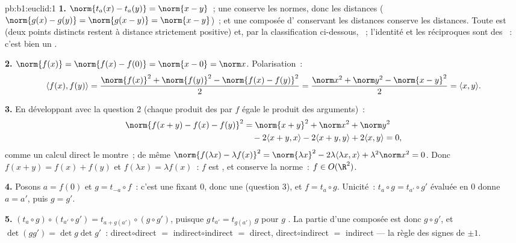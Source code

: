 \begin{solution}{pb:b1:euclid:1}
\textbf{1.} $\norm{t_a(x) - t_a(y)} = \norm{x - y}$~; une 
 conserve les normes, donc les distances ($\norm{g(x) - g(y)}
= \norm{g(x - y)} = \norm{x-y}$)~; et une composée d'
conservant les distances conserve les distances. Toute  est
 (deux points distincts restent à distance strictement
positive) et, par la classification ci-dessous, ~; l'identité
et les réciproques sont des ~: c'est bien un .

\textbf{2.} $\norm{f(x)} = \norm{f(x) - f(0)} = \norm{x - 0} =
\norm x$. Polarisation~:
\[
\langle f(x), f(y)\rangle
= \frac{\norm{f(x)}^2 + \norm{f(y)}^2 - \norm{f(x) -
f(y)}^2}{2}
= \frac{\norm x^2 + \norm y^2 - \norm{x - y}^2}{2}
= \langle x, y\rangle .
\]

\textbf{3.} En développant avec la question 2 (chaque produit des
 par $f$ égale le produit des arguments)~:
\begin{align*}
\norm{f(x+y) - f(x) - f(y)}^2
&= \norm{x+y}^2 + \norm x^2 + \norm y^2\\
&\quad - 2\langle x+y, x\rangle - 2\langle x+y, y\rangle
+ 2\langle x, y\rangle = 0 ,
\end{align*}
comme un calcul direct le montre~; de même $\norm{f(\lambda x) -
\lambda f(x)}^2 = \norm{\lambda x}^2 - 2\lambda\langle \lambda
x, x\rangle + \lambda^2\norm x^2 = 0$. Donc $f(x + y) = f(x) +
f(y)$ et $f(\lambda x) = \lambda f(x)$~: $f$ est , et
conserve la norme~: $f \in O(\R^2)$.

\textbf{4.} Posons $a = f(0)$ et $g = t_{-a}\circ f$~: c'est une
 fixant $0$, donc une   (question 3), et
$f = t_a \circ g$. Unicité~: $t_a \circ g = t_{a'}\circ g'$ évaluée
en $0$ donne $a = a'$, puis $g = g'$.

\textbf{5.} $(t_a\circ g)\circ(t_{a'}\circ g') = t_{a +
g(a')}\circ(g\circ g')$, puisque $g\,t_{a'} = t_{g(a')}\,g$ pour $g$
. La partie  d'une composée est donc $g \circ g'$,
et $\det(gg') = \det g \det g'$~: direct$\circ$direct $=$
indirect$\circ$indirect $=$ direct,
direct$\circ$indirect $=$ indirect --- la règle des signes de $\pm1$.


\end{solution}
